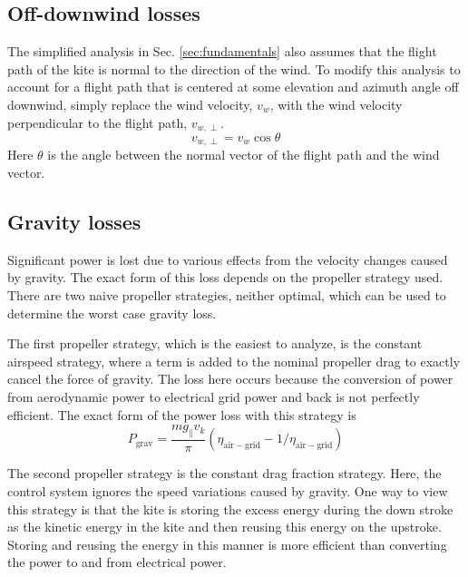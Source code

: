 \documentclass[11pt]{amsart}
\newcommand{\airgrid}{\mathrm{air-grid}}
\newcommand{\grav}{\mathrm{grav}}
\newcommand{\kite}{k}
\newcommand{\wind}{w}
\begin{document}
\subsection{Off-downwind losses}

The simplified analysis in Sec. \ref{sec:fundamentals} also assumes
that the flight path of the kite is normal to the direction of the
wind.  To modify this analysis to account for a flight path that is
centered at some elevation and azimuth angle off downwind, simply
replace the wind velocity, $v_{\wind}$, with the wind velocity
perpendicular to the flight path, $v_{\wind, \perp}$.
%
\begin{equation}
v_{\wind, \perp} = v_{\wind} \cos \theta
\end{equation}
%
Here $\theta$ is the angle between the normal vector of the flight
path and the wind vector.

\subsection{Gravity losses}

Significant power is lost due to various effects from the velocity
changes caused by gravity.  The exact form of this loss depends on the
propeller strategy used.  There are two naive propeller strategies,
neither optimal, which can be used to determine the worst case gravity
loss.

The first propeller strategy, which is the easiest to analyze, is the
constant airspeed strategy, where a term is added to the nominal
propeller drag to exactly cancel the force of gravity.  The loss here
occurs because the conversion of power from aerodynamic power to
electrical grid power and back is not perfectly efficient.  The exact
form of the power loss with this strategy is
%
\begin{equation}
  \label{eqn:gravity_loss1}
  P_{\grav} = \frac{m g_{\parallel} v_{\kite}}{\pi}
  \left( \eta_{\airgrid} - 1/\eta_{\airgrid} \right)
\end{equation}

The second propeller strategy is the constant drag fraction strategy.
Here, the control system ignores the speed variations caused by
gravity.  One way to view this strategy is that the kite is storing
the excess energy during the down stroke as the kinetic energy in the
kite and then reusing this energy on the upstroke.  Storing and
reusing the energy in this manner is more efficient than converting
the power to and from electrical power.
\end{document}
